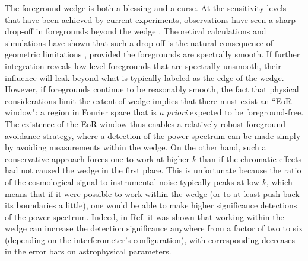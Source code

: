 \documentclass[twocolumn,aps,prd,nofootinbib,showpacs]{revtex4-1}
\begin{document}
The foreground wedge is both a blessing and a curse.  At the sensitivity levels that have been achieved by current experiments, observations have seen a sharp drop-off in foregrounds beyond the wedge \cite{Pober2013}.  Theoretical calculations and simulations have shown that such a drop-off is the natural consequence of geometric limitations \cite{Parsons2012b}, provided the foregrounds are spectrally smooth.  If further integration reveals low-level foregrounds that are spectrally unsmooth, their influence will leak beyond what is typically labeled as the edge of the wedge.  However, if foregrounds continue to be reasonably smooth, the fact that physical considerations limit the extent of wedge implies that there must exist an ``EoR window": a region in Fourier space that is \emph{a priori} expected to be foreground-free.  The existence of the EoR window thus enables a relatively robust foreground avoidance strategy, where a detection of the power spectrum can be made simply by avoiding measurements within the wedge.  On the other hand, such a conservative approach forces one to work at higher $k$ than if the chromatic effects had not caused the wedge in the first place.  This is unfortunate because the ratio of the cosmological signal to instrumental noise typically peaks at low $k$, which means that if it were possible to work within the wedge (or to at least push back its boundaries a little), one would be able to make higher significance detections of the power spectrum.  Indeed, in Ref. \cite{Pober2014} it was shown that working within the wedge can increase the detection significance anywhere from a factor of two to six (depending on the interferometer's configuration), with corresponding decreases in the error bars on astrophysical parameters.
\end{document}
